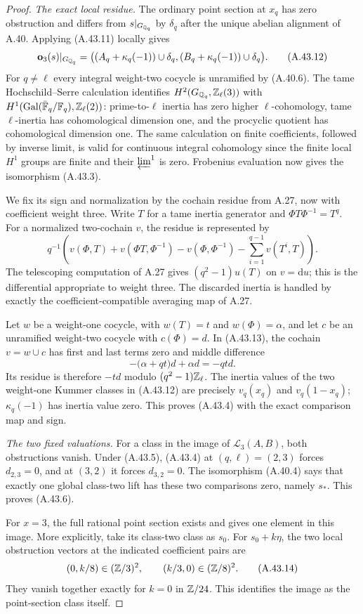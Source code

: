 \begin{proof}
\emph{The exact local residue.}
The ordinary point section at $x_q$ has zero obstruction and
differs from $s|_{G_{\mathbb Q_q}}$ by $\delta_q$ after the unique
abelian alignment of A.40.  Applying (A.43.11) locally gives
\[
 \mathbf o_3(s)|_{G_{\mathbb Q_q}}
   =\bigl((A_q+\kappa_q(-1))\cup\delta_q,
           (B_q+\kappa_q(-1))\cup\delta_q\bigr).
 \tag{A.43.12}
\]
For $q\ne\ell$ every integral weight-two cocycle is unramified
by (A.40.6).  The tame Hochschild--Serre calculation identifies
$H^2(G_{\mathbb Q_q},\mathbb Z_\ell(3))$ with
$H^1(\operatorname{Gal}(\bar{\mathbb F}_q/\mathbb F_q),\mathbb Z_\ell(2))$:
prime-to-$\ell$ inertia has zero higher $\ell$-cohomology,
tame $\ell$-inertia has cohomological dimension one, and the
procyclic quotient has cohomological dimension one.  The same
calculation on finite coefficients, followed by inverse limit,
is valid for continuous integral cohomology since the finite
local $H^1$ groups are finite and their $\varprojlim^1$ is zero.
Frobenius evaluation now gives the isomorphism (A.43.3).

We fix its sign and normalization by the cochain residue from
A.27, now with coefficient weight three.  Write $T$ for a tame
inertia generator and $\Phi T\Phi^{-1}=T^q$.  For a normalized
two-cochain $v$, the residue is represented by
\[
 q^{-1}\left(v(\Phi,T)+v(\Phi T,\Phi^{-1})
       -v(\Phi,\Phi^{-1})
       -\sum_{i=1}^{q-1}v(T^i,T)\right).
 \tag{A.43.13}
\]
The telescoping computation of A.27 gives
$(q^2-1)u(T)$ on $v=\mathrm du$; this is the differential
appropriate to weight three.  The discarded inertia is handled
by exactly the coefficient-compatible averaging map of A.27.

Let $w$ be a weight-one cocycle, with $w(T)=t$ and
$w(\Phi)=\alpha$, and let $c$ be an unramified weight-two
cocycle with $c(\Phi)=d$.  In (A.43.13), the cochain
$v=w\cup c$ has first and last terms zero and middle
difference
\[
                   -\bigl(\alpha+qt\bigr)d+\alpha d=-qtd.
\]
Its residue is therefore $-td$ modulo $(q^2-1)\mathbb Z_\ell$.
The inertia values of the two weight-one Kummer classes in
(A.43.12) are precisely $v_q(x_q)$ and $v_q(1-x_q)$;
$\kappa_q(-1)$ has inertia value zero.  This proves (A.43.4)
with the exact comparison map and sign.

\emph{The two fixed valuations.}
For a class in the image of $\mathscr L_3(A,B)$, both
obstructions vanish.  Under (A.43.5), (A.43.4) at
$(q,\ell)=(2,3)$ forces $d_{2,3}=0$, and at $(3,2)$ it
forces $d_{3,2}=0$.  The isomorphism (A.40.4) says that
exactly one global class-two lift has these two comparisons
zero, namely $s_*$.  This proves (A.43.6).

For $x=3$, the full rational point section exists and gives
one element in this image.  More explicitly, take its class-two
class as $s_0$.  For $s_0+k\eta$, the two local obstruction
vectors at the indicated coefficient pairs are
\[
       (0,k/8)\in(\mathbb Z/3)^2,
       \qquad(k/3,0)\in(\mathbb Z/8)^2.
 \tag{A.43.14}
\]
They vanish together exactly for $k=0$ in $\mathbb Z/24$.
This identifies the image as the point-section class itself.
\end{proof}

